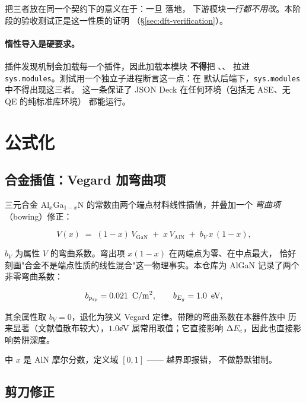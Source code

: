 把三者放在同一个契约下的意义在于：一旦  落地，
下游模块\emph{一行都不用改}。本阶段的验收测试正是这一性质的证明
（\S\ref{sec:dft-verification}）。

\paragraph{惰性导入是硬要求。} 插件发现机制会加载每一个插件，因此加载本模块
\textbf{不得}把 、、 拉进
\texttt{sys.modules}。测试用一个独立子进程断言这一点：在
 默认后端下，\texttt{sys.modules} 中不得出现这三者。
这一条保证了 JSON Deck 在任何环境（包括无 ASE、无 QE 的纯标准库环境）
都能运行。

\section{公式化}
\label{sec:dft-formulation}

\subsection{合金插值：Vegard 加弯曲项}
\label{sec:dft-vegard}

三元合金 Al$_x$Ga$_{1-x}$N 的常数由两个端点材料线性插值，并叠加一个
\emph{弯曲项}（bowing）修正：

\begin{equation}
V(x) \;=\; (1-x)\,V_{\text{GaN}} \;+\; x\,V_{\text{AlN}}
\;+\; b_V\,x\,(1-x),
\label{eq:vegard}
\end{equation}

$b_V$ 为属性 $V$ 的弯曲系数。弯出项 $x(1-x)$ 在两端点为零、在中点最大，
恰好刻画"合金不是端点性质的线性混合"这一物理事实。本仓库为 AlGaN
记录了两个非零弯曲系数：

\begin{equation}
b_{p_{\text{sp}}} = 0.021\ \,\mathrm{C/m^2},
\qquad
b_{E_g} = 1.0\ \,\mathrm{eV},
\label{eq:bowing}
\end{equation}

其余属性取 $b_V=0$，退化为狭义 Vegard 定律。带隙的弯曲系数在本器件族中
历来显著（文献值散布较大），$1.0$\U{eV} 属常用取值；它直接影响
$\Delta E_{\mathrm{c}}$，因此也直接影响势阱深度。

 中 $x$ 是 AlN 摩尔分数，定义域 $[0,1]$ —— 越界即报错，
不做静默钳制。

\subsection{剪刀修正}
\label{sec:dft-scissor}

